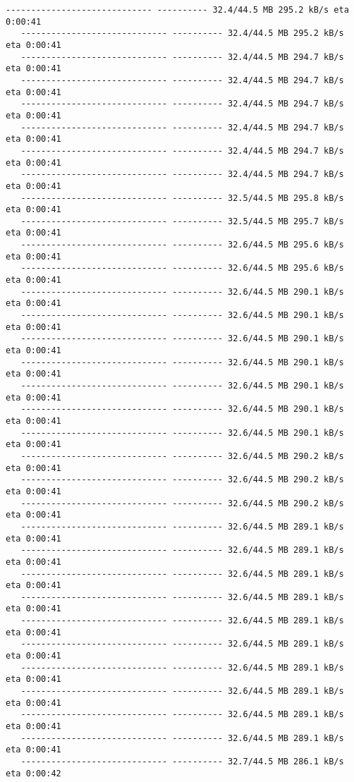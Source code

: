 \documentclass[11pt]{article}
\begin{document}
\begin{Verbatim}[commandchars=\\\{\}]
   ----------------------------- ---------- 32.4/44.5 MB 295.2 kB/s eta 0:00:41
   ----------------------------- ---------- 32.4/44.5 MB 295.2 kB/s eta 0:00:41
   ----------------------------- ---------- 32.4/44.5 MB 294.7 kB/s eta 0:00:41
   ----------------------------- ---------- 32.4/44.5 MB 294.7 kB/s eta 0:00:41
   ----------------------------- ---------- 32.4/44.5 MB 294.7 kB/s eta 0:00:41
   ----------------------------- ---------- 32.4/44.5 MB 294.7 kB/s eta 0:00:41
   ----------------------------- ---------- 32.4/44.5 MB 294.7 kB/s eta 0:00:41
   ----------------------------- ---------- 32.4/44.5 MB 294.7 kB/s eta 0:00:41
   ----------------------------- ---------- 32.5/44.5 MB 295.8 kB/s eta 0:00:41
   ----------------------------- ---------- 32.5/44.5 MB 295.7 kB/s eta 0:00:41
   ----------------------------- ---------- 32.6/44.5 MB 295.6 kB/s eta 0:00:41
   ----------------------------- ---------- 32.6/44.5 MB 295.6 kB/s eta 0:00:41
   ----------------------------- ---------- 32.6/44.5 MB 290.1 kB/s eta 0:00:41
   ----------------------------- ---------- 32.6/44.5 MB 290.1 kB/s eta 0:00:41
   ----------------------------- ---------- 32.6/44.5 MB 290.1 kB/s eta 0:00:41
   ----------------------------- ---------- 32.6/44.5 MB 290.1 kB/s eta 0:00:41
   ----------------------------- ---------- 32.6/44.5 MB 290.1 kB/s eta 0:00:41
   ----------------------------- ---------- 32.6/44.5 MB 290.1 kB/s eta 0:00:41
   ----------------------------- ---------- 32.6/44.5 MB 290.1 kB/s eta 0:00:41
   ----------------------------- ---------- 32.6/44.5 MB 290.2 kB/s eta 0:00:41
   ----------------------------- ---------- 32.6/44.5 MB 290.2 kB/s eta 0:00:41
   ----------------------------- ---------- 32.6/44.5 MB 290.2 kB/s eta 0:00:41
   ----------------------------- ---------- 32.6/44.5 MB 289.1 kB/s eta 0:00:41
   ----------------------------- ---------- 32.6/44.5 MB 289.1 kB/s eta 0:00:41
   ----------------------------- ---------- 32.6/44.5 MB 289.1 kB/s eta 0:00:41
   ----------------------------- ---------- 32.6/44.5 MB 289.1 kB/s eta 0:00:41
   ----------------------------- ---------- 32.6/44.5 MB 289.1 kB/s eta 0:00:41
   ----------------------------- ---------- 32.6/44.5 MB 289.1 kB/s eta 0:00:41
   ----------------------------- ---------- 32.6/44.5 MB 289.1 kB/s eta 0:00:41
   ----------------------------- ---------- 32.6/44.5 MB 289.1 kB/s eta 0:00:41
   ----------------------------- ---------- 32.6/44.5 MB 289.1 kB/s eta 0:00:41
   ----------------------------- ---------- 32.6/44.5 MB 289.1 kB/s eta 0:00:41
   ----------------------------- ---------- 32.7/44.5 MB 286.1 kB/s eta 0:00:42

\end{Verbatim}
\end{document}
